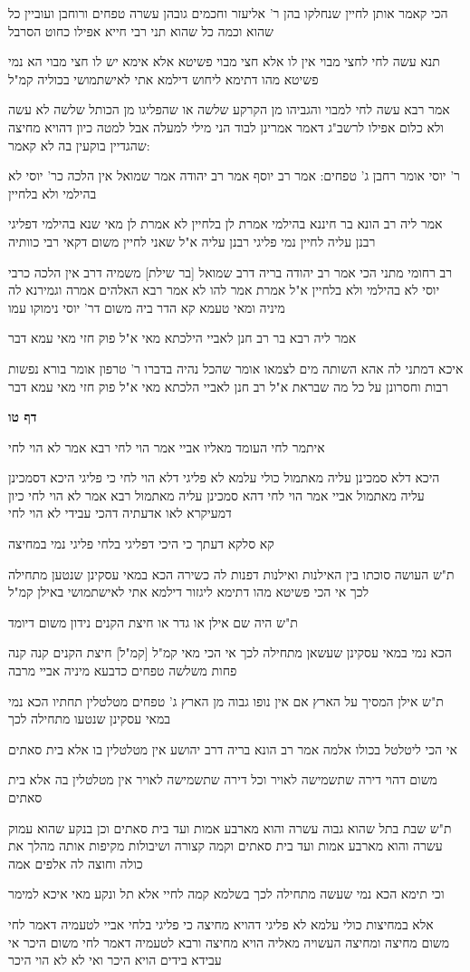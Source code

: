 \documentclass[12pt, openany]{book}
\newcommand{\sethebfont}{
\fontsize{10.5pt}{21.0pt} \selectfont
}
\newcommand{\textblock}[1]{
{\sethebfont #1\\}	
}
\newcommand{\sectname}{}
\newcommand{\newsection}[1]{
	\addcontentsline{toc}{section}{#1}
	\renewcommand{\sectname}{#1}	
	\vspace{-\baselineskip}
	\begin{center}
		\textbf{%
\fontsize{16pt}{16pt}\selectfont
			#1}
	\end{center}
	\vspace{-\baselineskip}
	\nopagebreak
}
\begin{document}
\textblock{הכי קאמר אותן לחיין שנחלקו בהן ר' אליעזר וחכמים גובהן עשרה טפחים ורוחבן ועוביין כל שהוא וכמה כל שהוא תני רבי חייא אפילו כחוט הסרבל}
\textblock{תנא עשה לחי לחצי מבוי אין לו אלא חצי מבוי פשיטא אלא אימא יש לו חצי מבוי הא נמי פשיטא מהו דתימא ליחוש דילמא אתי לאישתמושי בכוליה קמ"ל}
\textblock{אמר רבא עשה לחי למבוי והגביהו מן הקרקע שלשה או שהפליגו מן הכותל שלשה לא עשה ולא כלום אפילו לרשב"ג דאמר אמרינן לבוד הני מילי למעלה אבל למטה כיון דהויא מחיצה שהגדיין בוקעין בה לא קאמר:}
\textblock{ר' יוסי אומר רחבן ג' טפחים: אמר רב יוסף אמר רב יהודה אמר שמואל אין הלכה כר' יוסי לא בהילמי ולא בלחיין}
\textblock{אמר ליה רב הונא בר חיננא בהילמי אמרת לן בלחיין לא אמרת לן מאי שנא בהילמי דפליגי רבנן עליה לחיין נמי פליגי רבנן עליה א"ל שאני לחיין משום דקאי רבי כוותיה}
\textblock{רב רחומי מתני הכי אמר רב יהודה בריה דרב שמואל [בר שילת] משמיה דרב אין הלכה כרבי יוסי לא בהילמי ולא בלחיין א"ל אמרת אמר להו לא אמר רבא האלהים אמרה וגמירנא לה מיניה ומאי טעמא קא הדר ביה משום דר' יוסי נימוקו עמו}
\textblock{אמר ליה רבא בר רב חנן לאביי הילכתא מאי א"ל פוק חזי מאי עמא דבר}
\textblock{איכא דמתני לה אהא השותה מים לצמאו אומר שהכל נהיה בדברו ר' טרפון אומר בורא נפשות רבות וחסרונן על כל מה שבראת א"ל רב חנן לאביי הלכתא מאי א"ל פוק חזי מאי עמא דבר}
\newsection{דף טו}
\textblock{איתמר לחי העומד מאליו אביי אמר הוי לחי רבא אמר לא הוי לחי}
\textblock{היכא דלא סמכינן עליה מאתמול כולי עלמא לא פליגי דלא הוי לחי כי פליגי היכא דסמכינן עליה מאתמול אביי אמר הוי לחי דהא סמכינן עליה מאתמול רבא אמר לא הוי לחי כיון דמעיקרא לאו אדעתיה דהכי עבידי לא הוי לחי}
\textblock{קא סלקא דעתך כי היכי דפליגי בלחי פליגי נמי במחיצה}
\textblock{ת"ש העושה סוכתו בין האילנות ואילנות דפנות לה כשירה הכא במאי עסקינן שנטען מתחילה לכך אי הכי פשיטא מהו דתימא ליגזור דילמא אתי לאישתמושי באילן קמ"ל}
\textblock{ת"ש היה שם אילן או גדר או חיצת הקנים נידון משום דיומד}
\textblock{הכא נמי במאי עסקינן שעשאן מתחילה לכך אי הכי מאי קמ"ל [קמ"ל] חיצת הקנים קנה קנה פחות משלשה טפחים כדבעא מיניה אביי מרבה}
\textblock{ת"ש אילן המסיך על הארץ אם אין נופו גבוה מן הארץ ג' טפחים מטלטלין תחתיו הכא נמי במאי עסקינן שנטעו מתחילה לכך}
\textblock{אי הכי ליטלטל בכולו אלמה אמר רב הונא בריה דרב יהושע אין מטלטלין בו אלא בית סאתים}
\textblock{משום דהוי דירה שתשמישה לאויר וכל דירה שתשמישה לאויר אין מטלטלין בה אלא בית סאתים}
\textblock{ת"ש שבת בתל שהוא גבוה עשרה והוא מארבע אמות ועד בית סאתים וכן בנקע שהוא עמוק עשרה והוא מארבע אמות ועד בית סאתים וקמה קצורה ושיבולות מקיפות אותה מהלך את כולה וחוצה לה אלפים אמה}
\textblock{וכי תימא הכא נמי שעשה מתחילה לכך בשלמא קמה לחיי אלא תל ונקע מאי איכא למימר}
\textblock{אלא במחיצות כולי עלמא לא פליגי דהויא מחיצה כי פליגי בלחי אביי לטעמיה דאמר לחי משום מחיצה ומחיצה העשויה מאליה הויא מחיצה ורבא לטעמיה דאמר לחי משום היכר אי עבידא בידים הויא היכר ואי לא לא הוי היכר}
\end{document}
